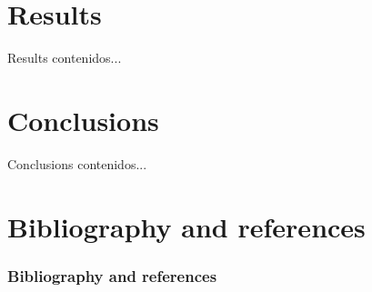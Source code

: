 \documentclass[11pt]{beamer}
\begin{document}
	\section{Results}
		\begin{frame}{Results}
		contenidos...
		\end{frame}
	\section{Conclusions}
		\begin{frame}{Conclusions}
		contenidos...
		\end{frame}
	\section{Bibliography and references}
		\begin{frame}[allowframebreaks]
		\frametitle{Bibliography and references}
			
			
		\end{frame}
\end{document}
